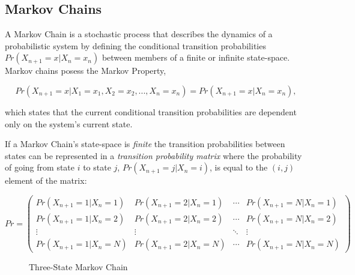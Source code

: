 \subsection{Markov Chains}
\label{subsec:markovchains}

A Markov Chain is a stochastic process that describes the dynamics of a probabilistic system by defining the conditional transition probabilities \(Pr(X_{n+1}=x|X_n=x_n)\) between members of a finite or infinite state-space. Markov chains posess the Markov Property,

\[
Pr(X_{n+1}=x|X_1=x_1,X_2=x_2,...,X_n=x_n) = Pr(X_{n+1}=x|X_n=x_n),
\]

which states that the current conditional transition probabilities are dependent only on the system's current state.

If a Markov Chain's state-space is \textit{finite} the transition probabilities between states can be represented in a \textit{transition probability matrix} where the probability of going from state $i$ to state $j$, $Pr(X_{n+1}=j|X_n=i)$, is equal to the $(i,j)$ element of the matrix:

\[
 Pr =
 \begin{pmatrix}
  Pr(X_{n+1}=1|X_n=1) & Pr(X_{n+1}=2|X_n=1) & \cdots & Pr(X_{n+1}=N|X_n=1) \\
  Pr(X_{n+1}=1|X_n=2) & Pr(X_{n+1}=2|X_n=2) & \cdots & Pr(X_{n+1}=N|X_n=2) \\
  \vdots  & \vdots  & \ddots & \vdots  \\
  Pr(X_{n+1}=1|X_n=N) & Pr(X_{n+1}=2|X_n=N) & \cdots & Pr(X_{n+1}=N|X_n=N)
 \end{pmatrix}
\]

\begin{figure}[h!]
\begin{center}
\end{center}
\caption{Three-State Markov Chain}
\label{3statemarkovchain}
\end{figure}

